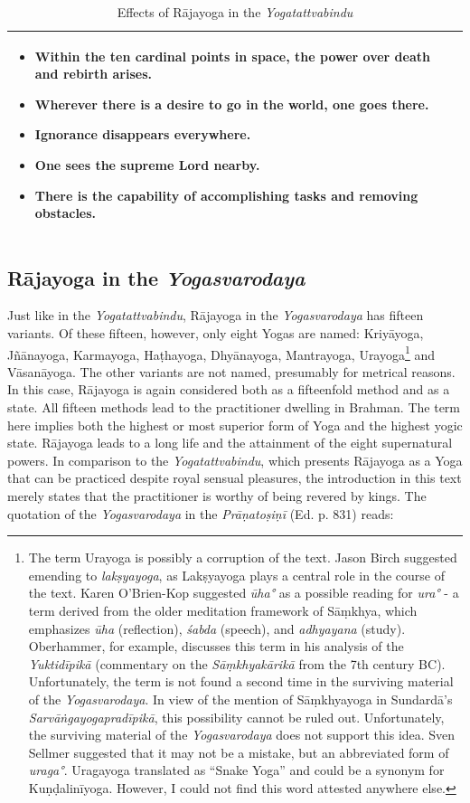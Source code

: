 \begin{table}[H]
\begin{tabular}{|p{3cm}|p{4cm}|p{4cm}|}
\begin{itemize}
    \item Within the ten cardinal points in space, the power over death and rebirth arises.
    \item Wherever there is a desire to go in the world, one goes there.
    \item Ignorance disappears everywhere.
    \item One sees the supreme Lord nearby.
    \item There is the capability of accomplishing tasks and removing obstacles.
\end{itemize} \\
\hline
\end{tabular}
\caption{Effects of Rājayoga in the \emph{Yogatattvabindu}}
\end{table}
\normalsize
\newpage 
\subsection{Rājayoga in the \textit{Yogasvarodaya}}

Just like in the \emph{Yogatattvabindu}, Rājayoga in the \emph{Yogasvarodaya} has fifteen variants. Of these fifteen, however, only eight Yogas are named: Kriyāyoga, Jñānayoga, Karmayoga, Haṭhayoga, Dhyānayoga, Mantrayoga, Urayoga\footnote{The term Urayoga is possibly a corruption of the text. Jason Birch suggested emending to \textit{lakṣyayoga}, as Lakṣyayoga plays a central role in the course of the text. Karen O'Brien-Kop suggested \textit{ūha°} as a possible reading for \textit{ura°} - a term derived from the older meditation framework of Sāṃkhya, which emphasizes \textit{ūha} (reflection), \textit{śabda} (speech), and \textit{adhyayana} (study). Oberhammer, for example, discusses this term in his analysis of the \emph{Yuktidīpikā} (commentary on the \emph{Sāṃkhyakārikā} from the 7th century BC). Unfortunately, the term is not found a second time in the surviving material of the \emph{Yogasvarodaya}. In view of the mention of Sāṃkhyayoga in Sundardā's \textit{Sarvāṅgayogapradīpikā}, this possibility cannot be ruled out. Unfortunately, the surviving material of the \textit{Yogasvarodaya} does not support this idea. Sven Sellmer suggested that it may not be a mistake, but an abbreviated form of \textit{uraga°}. Uragayoga translated as ``Snake Yoga'' and could be a synonym for Kuṇḍalinīyoga. However, I could not find this word attested anywhere else.} and Vāsanāyoga. The other variants are not named, presumably for metrical reasons. In this case, Rājayoga is again considered both as a fifteenfold method and as a state. All fifteen methods lead to the practitioner dwelling in Brahman. The term here implies both the highest or most superior form of Yoga and the highest yogic state. Rājayoga leads to a long life and the attainment of the eight supernatural powers. In comparison to the \emph{Yogatattvabindu}, which presents Rājayoga as a Yoga that can be practiced despite royal sensual pleasures, the introduction in this text merely states that the practitioner is worthy of being revered by kings. The quotation of the \textit{Yogasvarodaya} in the \emph{Prāṇatoṣiṇī} (Ed. p. 831) reads:  


